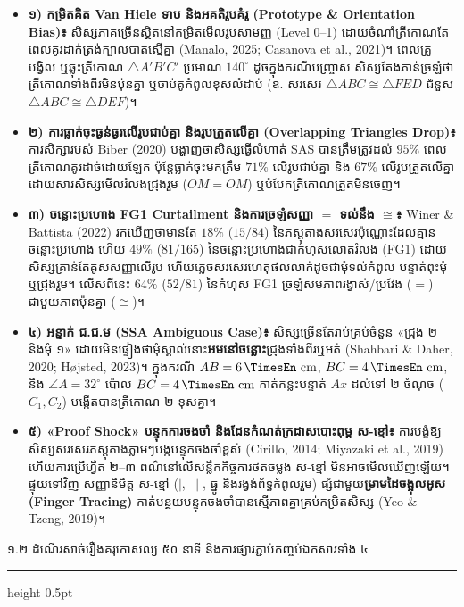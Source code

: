 \documentclass[a4paper,12pt]{article}
\newcommand{\en}[1]{{\TimesEn #1}}
\newcommand{\unit}[1]{\,\text{\en{#1}}}
\newcommand{\tri}[1]{\ensuremath{\triangle #1}}
\newcommand{\ang}[1]{\ensuremath{\angle #1}}
\newcommand{\cg}{\ensuremath{\cong}}
\newcommand{\subsec}[1]{%
  \Needspace{1.3cm}%
  \vspace{0pt}%
  {\muol\fontsize{11.5pt}{18.5pt}\selectfont #1}\par
  \vspace{1pt}\hrule height 0.5pt\vspace{2pt}%
}
\begin{document}
\begin{itemize}[leftmargin=0.55cm, topsep=3pt, itemsep=4pt, parsep=0pt]
  \item \textbf{១) កម្រិតគិត \en{Van Hiele} ទាប និងអគតិរូបគំរូ (\en{Prototype \& Orientation Bias})៖} សិស្សភាគច្រើនស្ថិតនៅកម្រិតមើលរូបសាមញ្ញ (\en{Level 0--1}) ដោយចំណាំត្រីកោណតែពេលគូរដាក់ត្រង់ក្បាលបាតស្មើគ្នា \en{(Manalo, 2025; Casanova et al., 2021)}។ ពេលគ្រូបង្វិល ឬឆ្លុះត្រីកោណ $\tri{A'B'C'}$ ប្រមាណ $140^\circ$ ដូចក្នុងករណីបញ្ច្រាស សិស្សតែងភាន់ច្រឡំថាត្រីកោណទាំងពីរមិនប៉ុនគ្នា ឬចាប់គូកំពូលខុសលំដាប់ (ឧ. សរសេរ $\tri{ABC}\cg\tri{FED}$ ជំនួស $\tri{ABC}\cg\tri{DEF}$)។
  \item \textbf{២) ការធ្លាក់ចុះធ្ងន់ធ្ងរលើរូបជាប់គ្នា និងរូបត្រួតលើគ្នា (\en{Overlapping Triangles Drop})៖} ការសិក្សារបស់ \en{Biber (2020)} បង្ហាញថាសិស្សធ្វើលំហាត់ \en{SAS} បានត្រឹមត្រូវដល់ $95\%$ ពេលត្រីកោណគូរដាច់ដោយឡែក ប៉ុន្តែធ្លាក់ចុះមកត្រឹម $71\%$ លើរូបជាប់គ្នា និង $67\%$ លើរូបត្រួតលើគ្នា ដោយសារសិស្សមើលរំលងជ្រុងរួម ($OM = OM$) ឬបំបែកត្រីកោណត្រួតមិនចេញ។
  \item \textbf{៣) ចន្លោះប្រហោង \en{FG1 Curtailment} និងការច្រឡំសញ្ញា $=$ ទល់នឹង $\cg$៖} \en{Winer \& Battista (2022)} រកឃើញថាមានតែ $18\%$ ($15/84$) នៃភស្តុតាងសរសេរប៉ុណ្ណោះដែលគ្មានចន្លោះប្រហោង ហើយ $49\%$ ($81/165$) នៃចន្លោះប្រហោងជាកំហុសលោតរំលង (\en{FG1}) ដោយសិស្សគ្រាន់តែគូសសញ្ញាលើរូប ហើយភ្លេចសរសេរហេតុផលលាក់ដូចជាមុំទល់កំពូល បន្ទាត់ពុះមុំ ឬជ្រុងរួម។ លើសពីនេះ $64\%$ ($52/81$) នៃកំហុស \en{FG1} ច្រឡំសមភាពរង្វាស់/ប្រវែង ($=$) ជាមួយភាពប៉ុនគ្នា ($\cg$)។
  \item \textbf{៤) អន្ទាក់ ជ.ជ.ម (\en{SSA Ambiguous Case})៖} សិស្សច្រើនតែរាប់គ្រប់ចំនួន «ជ្រុង ២ និងមុំ ១» ដោយមិនផ្ទៀងថាមុំស្គាល់នោះ\textbf{អមនៅចន្លោះ}ជ្រុងទាំងពីរឬអត់ \en{(Shahbari \& Daher, 2020; H\o jsted, 2023)}។ ក្នុងករណី $AB = 6\unit{cm}$, $BC = 4\unit{cm}$, និង $\ang{A} = 32^\circ$ ប៉ោល $BC = 4\unit{cm}$ កាត់កន្លះបន្ទាត់ $Ax$ ដល់ទៅ ២ ចំណុច ($C_1, C_2$) បង្កើតបានត្រីកោណ ២ ខុសគ្នា។
  \item \textbf{៥) «\en{Proof Shock}» បន្ទុកការចងចាំ និងដែនកំណត់ក្រដាសបោះពុម្ព ស-ខ្មៅ៖} ការបង្ខំឱ្យសិស្សសរសេរភស្តុតាងភ្លាមៗបង្កបន្ទុកចងចាំខ្ពស់ \en{(Cirillo, 2014; Miyazaki et al., 2019)} ហើយការប្រើហ្វឺត ២--៣ ពណ៌នៅលើសន្លឹកកិច្ចការថតចម្លង ស-ខ្មៅ មិនអាចមើលឃើញឡើយ។ ផ្ទុយទៅវិញ សញ្ញានិមិត្ត ស-ខ្មៅ ($|$, $\parallel$, ធ្នូ និងរង្វង់ព័ទ្ធកំពូលរួម) ផ្សំជាមួយ\textbf{ម្រាមដៃចង្អុលអូស (\en{Finger Tracing})} កាត់បន្ថយបន្ទុកចងចាំបានស្មើភាពគ្នាគ្រប់កម្រិតសិស្ស \en{(Yeo \& Tzeng, 2019)}។
\end{itemize}

\subsec{១.២ ដំណើរសាច់រឿងគរុកោសល្យ ៥០ នាទី និងការផ្សារភ្ជាប់កញ្ចប់ឯកសារទាំង ៤}
\end{document}
